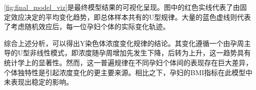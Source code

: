 \cref{fig:final_model_viz}是最终模型结果的可视化呈现。图中的红色实线代表了由固定效应决定的平均变化趋势，即总体样本共有的U型规律。大量的蓝色虚线则代表了考虑随机效应后，每一位孕妇个体的实际变化轨迹。

综合上述分析，可以得出Y染色体浓度变化规律的结论。其变化遵循一个由孕周主导的U型非线性模式，即浓度随孕周增加先发生下降，后转为上升，这一趋势具有统计学上的显著性。然而，这一普遍规律在不同孕妇个体间的表现存在巨大差异，个体独特性是引起浓度变化的更主要来源。相比之下，孕妇的BMI指标在此模型中未表现出稳定的影响。
